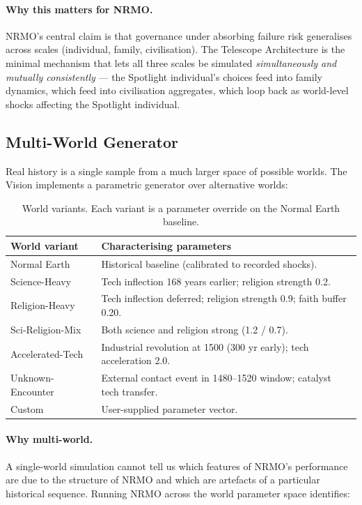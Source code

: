\paragraph{Why this matters for NRMO.}
NRMO's central claim is that governance under absorbing failure risk
generalises across scales (individual, family, civilisation). The
Telescope Architecture is the minimal mechanism that lets all three
scales be simulated \emph{simultaneously and mutually consistently} ---
the Spotlight individual's choices feed into family dynamics, which
feed into civilisation aggregates, which loop back as world-level
shocks affecting the Spotlight individual.

\subsection{Multi-World Generator}
\label{sec:vision-multiworld}

Real history is a single sample from a much larger space of possible
worlds. The Vision implements a parametric generator over alternative
worlds:

\begin{table}[ht]
\centering
\small
\begin{tabularx}{\linewidth}{Xl}
\toprule
\textbf{World variant} & \textbf{Characterising parameters} \\
\midrule
Normal Earth & Historical baseline (calibrated to recorded shocks). \\
Science-Heavy & Tech inflection 168 years earlier; religion strength 0.2. \\
Religion-Heavy & Tech inflection deferred; religion strength 0.9; faith
buffer 0.20. \\
Sci-Religion-Mix & Both science and religion strong (1.2 / 0.7). \\
Accelerated-Tech & Industrial revolution at 1500 (300 yr early); tech
acceleration 2.0. \\
Unknown-Encounter & External contact event in 1480--1520 window;
catalyst tech transfer. \\
Custom & User-supplied parameter vector. \\
\bottomrule
\end{tabularx}
\caption[World variants]{World variants. Each variant is a parameter
override on the Normal Earth baseline.}
\label{tab:vision-worlds}
\end{table}

\paragraph{Why multi-world.}
A single-world simulation cannot tell us which features of NRMO's
performance are due to the structure of NRMO and which are artefacts
of a particular historical sequence. Running NRMO across the world
parameter space identifies:

